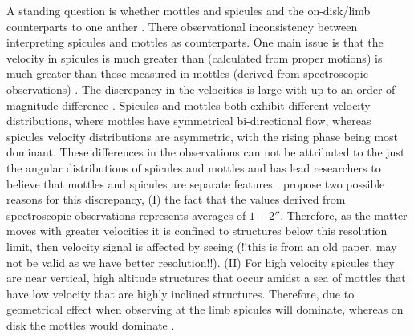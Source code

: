\documentclass[12pt]{ociamthesis}
\newcommand{\np}{\\ \\}
\begin{document}
A standing question is whether mottles and spicules and the on-disk/limb counterparts to one anther \citep{Tsiropoula1993A}. There observational inconsistency between interpreting spicules and mottles as counterparts. One main issue is that the velocity in spicules is much greater than (calculated from proper motions) is much greater than those measured in mottles (derived from spectroscopic observations) \citep{Grossmann1992AA264236G, Christopoulou2001SoPh19961C}. The discrepancy in the velocities is large with up to an order of magnitude difference \citep{Grossmann1973SoPh28319G}. Spicules and mottles both exhibit different velocity distributions, where mottles have symmetrical bi-directional flow, whereas spicules velocity distributions are asymmetric, with the rising phase being most dominant. These differences in the observations can not be attributed to the just the angular distributions of spicules and mottles \citep{Grossmann1992AA264236G} and has lead researchers to believe that mottles and spicules are separate features \citep{Christopoulou2001SoPh19961C}. \cite{Christopoulou2001SoPh19961C} propose two possible reasons for this discrepancy, (I) the fact that the values derived from spectroscopic observations represents averages of $1-\ang{;;2}$. Therefore, as the matter moves with greater velocities it is confined to structures below this resolution limit, then velocity signal is affected by seeing ({\color{green}!!this is from an old paper, may not be valid as we have better resolution!!)}. (II) For high velocity spicules they are near vertical, high altitude structures that occur amidst a sea of mottles that have low velocity that are highly inclined structures. Therefore, due to geometrical effect when observing at the limb spicules will dominate, whereas on disk the mottles would dominate \citep{Grossmann1992AA264236G}. \np
\end{document}
